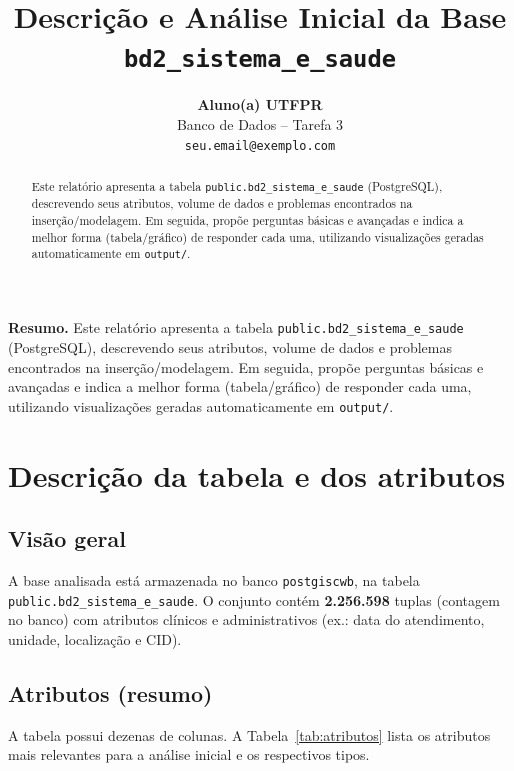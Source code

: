 \documentclass[12pt,a4paper]{article}
\title{\textbf{Descrição e Análise Inicial da Base \texttt{bd2\_sistema\_e\_saude}}}
\author{\textbf{Aluno(a) UTFPR}\\
Banco de Dados -- Tarefa 3\\
\texttt{seu.email@exemplo.com}}
\date{}
\begin{document}
\maketitle

\begin{abstract}
Este relatório apresenta a tabela \texttt{public.bd2\_sistema\_e\_saude} (PostgreSQL), descrevendo seus atributos, volume de dados e problemas encontrados na inserção/modelagem. Em seguida, propõe perguntas básicas e avançadas e indica a melhor forma (tabela/gráfico) de responder cada uma, utilizando visualizações geradas automaticamente em \texttt{output/}.
\end{abstract}

\noindent\textbf{Resumo.}
Este relatório apresenta a tabela \texttt{public.bd2\_sistema\_e\_saude} (PostgreSQL), descrevendo seus atributos, volume de dados e problemas encontrados na inserção/modelagem. Em seguida, propõe perguntas básicas e avançadas e indica a melhor forma (tabela/gráfico) de responder cada uma, utilizando visualizações geradas automaticamente em \texttt{output/}.

\section{Descrição da tabela e dos atributos}
\subsection{Visão geral}
A base analisada está armazenada no banco \texttt{postgiscwb}, na tabela \texttt{public.bd2\_sistema\_e\_saude}. O conjunto contém \textbf{2.256.598} tuplas (contagem no banco) com atributos clínicos e administrativos (ex.: data do atendimento, unidade, localização e CID).

\subsection{Atributos (resumo)}
A tabela possui dezenas de colunas. A Tabela~\ref{tab:atributos} lista os atributos mais relevantes para a análise inicial e os respectivos tipos.
\end{document}
